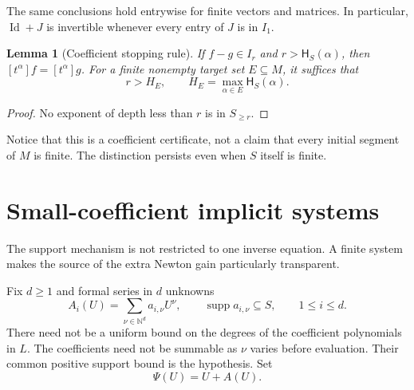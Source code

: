 \documentclass[11pt,a4paper]{article}
\newtheorem{lemma}[theorem]{Lemma}
\theoremstyle{definition}
\theoremstyle{remark}
\newcommand{\N}{\mathbb N}
\newcommand{\supp}{\operatorname{supp}}
\newcommand{\Id}{\operatorname{Id}}
\newcommand{\depth}{\mathsf H}
\newcommand{\coef}[1]{\left[#1\right]}
\begin{document}
The same conclusions hold entrywise for finite vectors and matrices. In
particular, $\Id+J$ is invertible whenever every entry of $J$ is in $I_1$.

\begin{lemma}[Coefficient stopping rule]\label{lem:stop}
If $f-g\in I_r$ and $r>\depth_S(\alpha)$, then
$\coef{t^\alpha}f=\coef{t^\alpha}g$. For a finite nonempty target set
$E\subseteq M$, it suffices that
\[
 r>H_E,\qquad H_E=\max_{\alpha\in E}\depth_S(\alpha).
\]
\end{lemma}
\begin{proof}
No exponent of depth less than $r$ is in $S_{\ge r}$.
\end{proof}

Notice that this is a coefficient certificate, not a claim that every
initial segment of $M$ is finite. The distinction persists even when $S$
itself is finite.

\section{Small-coefficient implicit systems}
\label{sec:implicit}

The support mechanism is not restricted to one inverse equation. A finite
system makes the source of the extra Newton gain particularly transparent.

Fix $d\ge1$ and formal series in $d$ unknowns
\begin{equation}\label{eq:A}
 A_i(U)=\sum_{\nu\in\N^d}a_{i,\nu}U^\nu,
 \qquad \supp a_{i,\nu}\subseteq S,
 \qquad 1\le i\le d.
\end{equation}
There need not be a uniform bound on the degrees of the coefficient
polynomials in $L$. The coefficients need not be summable as $\nu$ varies
before evaluation. Their common positive support bound is the hypothesis.
Set
\[
 \Psi(U)=U+A(U).
\]
\end{document}

